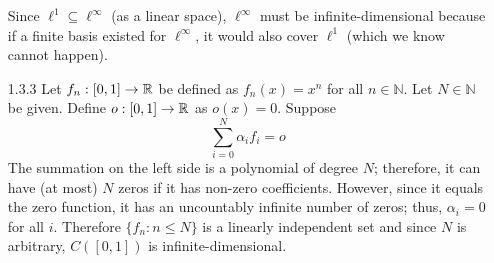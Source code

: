 \documentclass[../../Solutions.tex]{subfiles}
\begin{document}
\begin{itemize}
	Since $\ell^1 \subseteq \ell^\infty$ (as a linear space), $\ell^\infty$ must be infinite-dimensional because if a finite basis existed for $\ell^\infty$, it would also cover $\ell^1$ (which we know cannot happen).
	
	\item [1.3.3] Let $f_n:[0,1] \to \mathbb{R}$ be defined as $f_n(x) = x^n$ for all $n \in \mathbb{N}$.
	Let $N \in \mathbb{N}$ be given.
	Define $o:[0,1] \to \mathbb{R}$ as $o(x) = 0$.
	Suppose
	$$ \sum_{i=0}^N \alpha_i f_i = o $$
	The summation on the left side is a polynomial of degree $N$; therefore, it can have (at most) $N$ zeros if it has non-zero coefficients.
	However, since it equals the zero function, it has an uncountably infinite number of zeros; thus, $\alpha_i = 0$ for all $i$.
	Therefore $\{f_n : n \leq N \}$ is a linearly independent set and since $N$ is arbitrary, $C([0,1])$ is infinite-dimensional.
	
\end{itemize}
\end{document}
